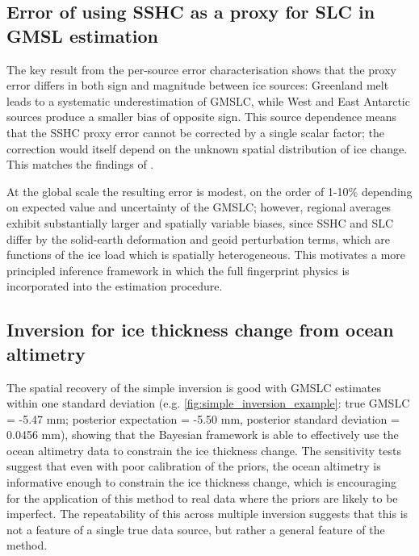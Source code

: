 \subsection{Error of using SSHC as a proxy for SLC in GMSL estimation}

The key result from the per-source error characterisation shows that the proxy error differs in both sign and magnitude between ice sources: Greenland melt leads to a systematic underestimation of GMSLC, while West and East Antarctic sources produce a smaller bias of opposite sign. This source dependence means that the SSHC proxy error cannot be corrected by a single scalar factor; the correction would itself depend on the unknown spatial distribution of ice change. This matches the findings of \textcite{lickleyBiasEstimatesGlobal2018, al-attarReciprocitySensitivityKernels2023}.

At the global scale the resulting error is modest, on the order of 1-10\% depending on expected value and uncertainty of the GMSLC; however, regional averages exhibit substantially larger and spatially variable biases, since SSHC and SLC differ by the solid-earth deformation and geoid perturbation terms, which are functions of the ice load which is spatially heterogeneous. This motivates a more principled inference framework in which the full fingerprint physics is incorporated into the estimation procedure.


\subsection{Inversion for ice thickness change from ocean altimetry}

The spatial recovery of the simple inversion is good with GMSLC estimates within one standard deviation
(e.g. \autoref{fig:simple_inversion_example}: true GMSLC = -5.47 mm; posterior expectation = -5.50 mm, posterior standard deviation = 0.0456 mm),
showing that the Bayesian framework is able to effectively use the ocean altimetry data to constrain the ice thickness change. The sensitivity tests suggest that even with poor calibration of the priors, the ocean altimetry is informative enough to constrain the ice thickness change, which is encouraging for the application of this method to real data where the priors are likely to be imperfect. The repeatability of this across multiple inversion suggests that this is not a feature of a single true data source, but rather a general feature of the method.

